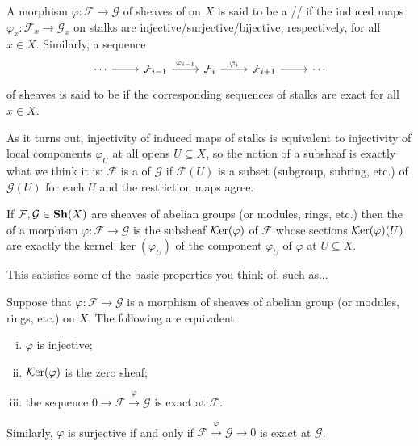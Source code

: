 \begin{defn}
	A morphism $\varphi : \mathcal{F} \to \mathcal{G}$ of sheaves of on $X$ is said to be a // if the induced maps $\varphi_x : \mathcal{F}_x \to \mathcal{G}_x$ on stalks are injective/surjective/bijective, respectively, for all $x \in X$. Similarly, a sequence
	\[
		\begin{tikzcd}
			\cdots \rar & \mathcal{F}_{i-1} \rar["\varphi_{i-1}"] & \mathcal{F}_i \rar["\varphi_i"] & \mathcal{F}_{i+1} \rar & \cdots
		\end{tikzcd}
	\]
	of sheaves is said to be  if the corresponding sequences of stalks are exact for all $x \in X$.
\end{defn}

As it turns out, injectivity of induced maps of stalks is equivalent to injectivity of local components $\varphi_U$ at all opens $U \subseteq X$, so the notion of a {subsheaf} is exactly what we think it is: $\mathcal{F}$ is a  of $\mathcal{G}$ if $\mathcal{F}(U)$ is a subset (subgroup, subring, etc.) of $\mathcal{G}(U)$ for each $U$ and the restriction maps agree.

\begin{defn}
	If $\mathcal{F}, \mathcal{G} \in \mathbf{Sh}(X)$ are sheaves of abelian groups (or modules, rings, etc.) then the  of a morphism $\varphi : \mathcal{F} \to \mathcal{G}$ is the subsheaf $\mathcal{K}\mathrm{er}(\varphi)$ of $\mathcal{F}$ whose sections $\mathcal{K}\mathrm{er}(\varphi)(U)$ are exactly the kernel $\ker(\varphi_U)$ of the component $\varphi_U$ of $\varphi$ at $U \subseteq X$.
\end{defn}

This satisfies some of the basic properties you think of, such as...
\begin{prop}
	Suppose that $\varphi : \mathcal{F} \to \mathcal{G}$ is a morphism of sheaves of abelian group (or modules, rings, etc.) on $X$. The following are equivalent:
	\begin{enumerate}[(i)]
		\item $\varphi$ is injective;
		\item $\mathcal{K}\mathrm{er}(\varphi)$ is the zero sheaf;
		\item the sequence $0 \to \mathcal{F} \xrightarrow{\varphi} \mathcal{G}$ is exact at $\mathcal{F}$.
	\end{enumerate}
	Similarly, $\varphi$ is surjective if and only if $\mathcal{F} \xrightarrow{\varphi} \mathcal{G} \to 0$ is exact at $\mathcal{G}$.
\end{prop}



